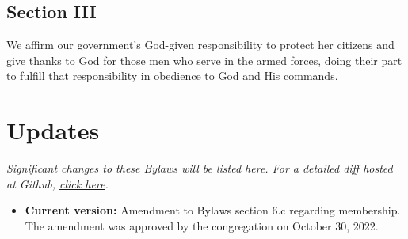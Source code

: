 \documentclass[
]{book}
\providecommand{\tightlist}{%
  \setlength{\itemsep}{0pt}\setlength{\parskip}{0pt}}
\begin{document}
\hypertarget{section-iii}{%
\section*{Section III}\label{section-iii}}

We affirm our government's God-given responsibility to protect her citizens and give thanks to God for those men who serve in the armed forces, doing their part to fulfill that responsibility in obedience to God and His commands.

\hypertarget{updates}{%
\chapter*{Updates}\label{updates}}

\emph{Significant changes to these Bylaws will be listed here. For a detailed diff hosted at Github, \href{https://github.com/Trinity-Reformed-Church/trc-bylaws}{click here}.}

\begin{itemize}
\tightlist
\item
  \textbf{Current version:} Amendment to Bylaws section 6.c regarding membership. The amendment was approved by the congregation on October 30, 2022.
\end{itemize}
\end{document}
